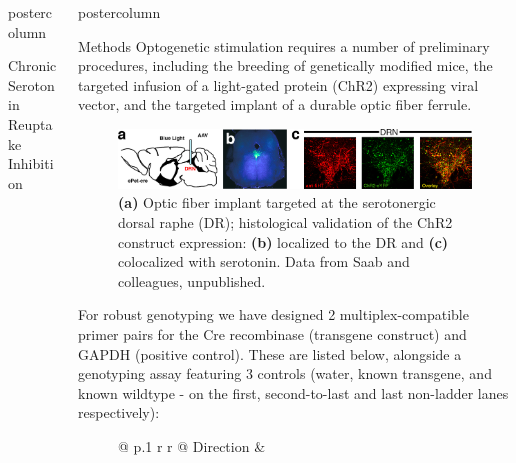 \documentclass{beamer}
\newlength{\columnheight}
\begin{document}
\begin{frame}
\begin{columns}
\begin{column}{.48\textwidth}
\begin{beamercolorbox}[center]{postercolumn}
{\begin{myblock}{Chronic Serotonin Reuptake Inhibition}
					\end{myblock}
		}
		\end{beamercolorbox}
	\end{column}
	\begin{column}{.48\textwidth}
		\begin{beamercolorbox}[center]{postercolumn}
				\parbox[t][\columnheight]{\textwidth}{ %
					\begin{myblock}{Methods}
						Optogenetic stimulation requires a number of preliminary 
						procedures, including the breeding of genetically modified mice,
						the targeted infusion of a light-gated protein (ChR2) expressing
						viral vector, and the targeted implant of a durable optic fiber
						ferrule.
						\vspace{0.2em}
						\begin{figure}
							\begin{minipage}{.94\textwidth}
								\centering\includegraphics[width=\textwidth]{img/og.png}
								\caption{\textbf{(a)} Optic fiber implant targeted at the
										serotonergic dorsal raphe (DR); histological validation of
										the ChR2 construct expression: \textbf{(b)} localized to
										the DR  and \textbf{(c)} colocalized with serotonin. Data
										from Saab and colleagues, unpublished.}
							\end{minipage}
						\end{figure}
						\vspace{0.4em}
						For robust genotyping we have designed 2 multiplex-compatible
						primer pairs for the Cre recombinase (transgene construct) and
						GAPDH (positive control).
						These are listed below, alongside a genotyping assay featuring 3
						controls (water, known transgene, and known wildtype - on the
						first, second-to-last and last non-ladder lanes respectively):
						\vspace{0.1em}
						\begin{figure}
							\begin{minipage}{.45\textwidth}
								\scriptsize
								\begin{tabular}{@{} p{.1\linewidth} r r @{}}
									\toprule
									Direction  &            \\

\end{tabular}
\end{minipage}
\end{figure}
\end{myblock}}
\end{beamercolorbox}
\end{column}
\end{columns}
\end{frame}
\end{document}
